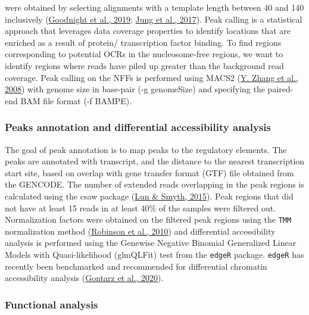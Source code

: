 \documentclass[12pt,twoside]{reedthesis}
\begin{document}
were obtained by selecting alignments with a template length between 40
and 140 inclusively (\protect\hyperlink{ref-goodnight2019}{Goodnight et al., 2019}; \protect\hyperlink{ref-jung2017}{Jung et al., 2017}). Peak calling is a
statistical approach that leverages data coverage properties to identify
locations that are enriched as a result of protein/ transcription factor
binding. To find regions corresponding to potential OCRs in the
nucleosome-free regions, we want to identify regions where reads have
piled up greater than the background read coverage. Peak calling on the
NFFs is performed using MACS2 (\protect\hyperlink{ref-zhang2008}{Y. Zhang et al., 2008}) with genome size in base-pair
(-g genomeSize) and specifying the paired-end BAM file format (-f
BAMPE).

\hypertarget{m3.3.2}{%
\subsubsection*{Peaks annotation and differential accessibility analysis}\label{m3.3.2}}

The goal of peak annotation is to map peaks to the regulatory
elements. The peaks are annotated with transcript, and the distance to
the nearest transcription start site, based on overlap with gene
transfer format (GTF) file obtained from the GENCODE. The number of
extended reads overlapping in the peak regions is calculated using the
csaw package (\protect\hyperlink{ref-lun2015}{Lun \& Smyth, 2015}). Peak regions that did not have at least 15
reads in at least 40\% of the samples were filtered out. Normalization
factors were obtained on the filtered peak regions using the \texttt{TMM}
normalization method (\protect\hyperlink{ref-robinson2010}{Robinson et al., 2010}) and differential accessibility
analysis is performed using the Genewise Negative Binomial Generalized
Linear Models with Quasi-likelihood (glmQLFit) test from the \texttt{edgeR}
package. \texttt{edgeR} has recently been benchmarked and
recommended for differential chromatin accessibility analysis
(\protect\hyperlink{ref-gontarz2020}{Gontarz et al., 2020}).

\hypertarget{m3.3.3}{%
\subsubsection*{Functional analysis}\label{m3.3.3}}
\end{document}
